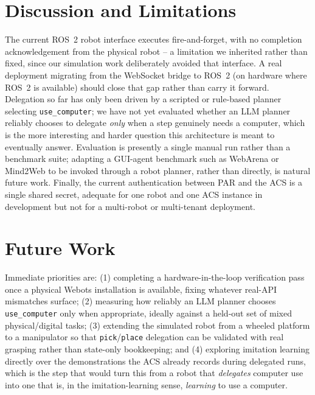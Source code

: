 \documentclass{article}
\begin{document}
\section{Discussion and Limitations}
The current ROS~2 robot interface executes fire-and-forget, with no
completion acknowledgement from the physical robot -- a limitation we
inherited rather than fixed, since our simulation work deliberately
avoided that interface. A real deployment migrating from the WebSocket
bridge to ROS~2 (on hardware where ROS~2 is available) should close that
gap rather than carry it forward. Delegation so far has only been driven
by a scripted or rule-based planner selecting \texttt{use\_computer}; we
have not yet evaluated whether an LLM planner reliably chooses to delegate
\emph{only} when a step genuinely needs a computer, which is the more
interesting and harder question this architecture is meant to eventually
answer. Evaluation is presently a single manual run rather than a
benchmark suite; adapting a GUI-agent benchmark such as
WebArena \citep{zhou2023webarena} or Mind2Web \citep{deng2023mind2web} to be
invoked through a robot planner, rather than directly, is natural future
work. Finally, the current authentication between PAR and the ACS is a
single shared secret, adequate for one robot and one ACS instance in
development but not for a multi-robot or multi-tenant deployment.

\section{Future Work}
Immediate priorities are: (1) completing a hardware-in-the-loop
verification pass once a physical Webots installation is available, fixing
whatever real-API mismatches surface; (2) measuring how reliably an LLM
planner chooses \texttt{use\_computer} only when appropriate, ideally
against a held-out set of mixed physical/digital tasks; (3) extending the
simulated robot from a wheeled platform to a manipulator so that
\texttt{pick}/\texttt{place} delegation can be validated with real
grasping rather than state-only bookkeeping; and (4) exploring imitation
learning directly over the demonstrations the ACS already records during
delegated runs, which is the step that would turn this from a robot that
\emph{delegates} computer use into one that is, in the imitation-learning
sense, \emph{learning} to use a computer.
\end{document}
